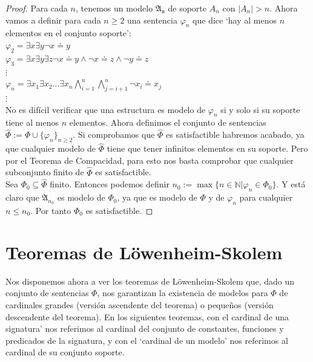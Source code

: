 \begin{proof}
Para cada $n$, tenemos un modelo $\mathfrak{A_n}$ de soporte $A_n$ con $|A_n|>n$.
Ahora vamos a definir para cada $n\geq2$ una sentencia $\varphi_n$ que dice `hay al menos $n$ elementos en el conjunto soporte':\\
$\varphi_2=\exists x\exists y\neg x\doteq y$\\
$\varphi_3=\exists x\exists y\exists z\neg x\doteq y\land\neg x\doteq z\land\neg y\doteq z$\\
$\vdots$\\
$\varphi_n=\exists x_1\exists x_2\dots\exists x_n\bigwedge_{i=1}^n\bigwedge_{j=i+1}^n\neg x_i\doteq x_j$\\
$\vdots$\\

No es difícil verificar que una estructura es modelo de $\varphi_n$ si y solo si su soporte tiene al menos $n$ elementos.
Ahora definimos el conjunto de sentencias $\hat{\Phi}:=\Phi\cup\{\varphi_n\}_{n\geq2}$.
Si comprobamos que $\hat{\Phi}$ es satisfactible habremos acabado, ya que cualquier modelo de $\hat{\Phi}$ tiene que tener infinitos elementos en su soporte. Pero por el Teorema de Compacidad, para esto nos basta comprobar que cualquier subconjunto finito de $\hat{\Phi}$ es satisfactible.\\

Sea $\Phi_0\subseteq\hat{\Phi}$ finito. Entonces podemos definir $n_0:=\max\{n\in\mathbb{N}|\varphi_n\in\Phi_0\}$. Y está claro que $\mathfrak{A}_{n_0}$ es modelo de $\Phi_0$, ya que es modelo de $\Phi$ y de $\varphi_n$ para cualquier $n\leq n_0$. Por tanto $\Phi_0$ es satisfactible.
\end{proof}

\section{Teoremas de Löwenheim-Skolem}

Nos disponemos ahora a ver los teoremas de Löwenheim-Skolem que, dado un conjunto de sentencias $\Phi$, nos garantizan la existencia de modelos para $\Phi$ de cardinales grandes (versión ascendente del teorema) o pequeños (versión descendente del teorema). En los siguientes teoremas, con el cardinal de una signatura' nos referimos al cardinal del conjunto de constantes, funciones y predicados de la signatura, y con el `cardinal de un modelo' nos referimos al cardinal de su conjunto soporte.

